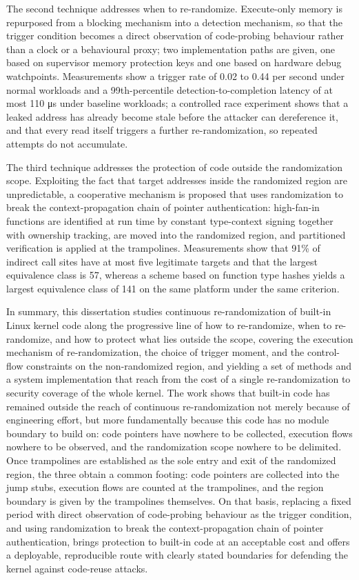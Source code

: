 The second technique addresses when to re-randomize. Execute-only memory is repurposed from a blocking mechanism into a detection mechanism, so that the trigger condition becomes a direct observation of code-probing behaviour rather than a clock or a behavioural proxy; two implementation paths are given, one based on supervisor memory protection keys and one based on hardware debug watchpoints. Measurements show a trigger rate of 0.02 to 0.44 per second under normal workloads and a 99th-percentile detection-to-completion latency of at most 110 μs under baseline workloads; a controlled race experiment shows that a leaked address has already become stale before the attacker can dereference it, and that every read itself triggers a further re-randomization, so repeated attempts do not accumulate.

The third technique addresses the protection of code outside the randomization scope. Exploiting the fact that target addresses inside the randomized region are unpredictable, a cooperative mechanism is proposed that uses randomization to break the context-propagation chain of pointer authentication: high-fan-in functions are identified at run time by constant type-context signing together with ownership tracking, are moved into the randomized region, and partitioned verification is applied at the trampolines. Measurements show that 91\% of indirect call sites have at most five legitimate targets and that the largest equivalence class is 57, whereas a scheme based on function type hashes yields a largest equivalence class of 141 on the same platform under the same criterion.

In summary, this dissertation studies continuous re-randomization of built-in Linux kernel code along the progressive line of how to re-randomize, when to re-randomize, and how to protect what lies outside the scope, covering the execution mechanism of re-randomization, the choice of trigger moment, and the control-flow constraints on the non-randomized region, and yielding a set of methods and a system implementation that reach from the cost of a single re-randomization to security coverage of the whole kernel. The work shows that built-in code has remained outside the reach of continuous re-randomization not merely because of engineering effort, but more fundamentally because this code has no module boundary to build on: code pointers have nowhere to be collected, execution flows nowhere to be observed, and the randomization scope nowhere to be delimited. Once trampolines are established as the sole entry and exit of the randomized region, the three obtain a common footing: code pointers are collected into the jump stubs, execution flows are counted at the trampolines, and the region boundary is given by the trampolines themselves. On that basis, replacing a fixed period with direct observation of code-probing behaviour as the trigger condition, and using randomization to break the context-propagation chain of pointer authentication, brings protection to built-in code at an acceptable cost and offers a deployable, reproducible route with clearly stated boundaries for defending the kernel against code-reuse attacks.

